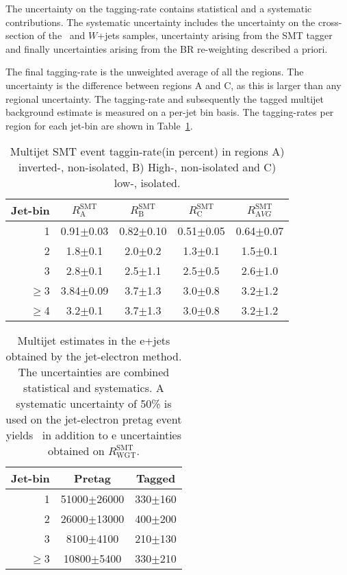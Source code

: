 The uncertainty on the tagging-rate contains statistical and a systematic contributions. The systematic uncertainty includes the uncertainty on the cross-section of the \ttbar\ and $W$+jets samples, uncertainty arising from the SMT tagger and finally uncertainties arising from the BR re-weighting described a priori.

The final tagging-rate is the unweighted average of all the regions. The uncertainty is the difference between regions A and C, as this is larger than any regional uncertainty. The tagging-rate and subsequently the tagged multijet background estimate is measured on a per-jet bin basis. The tagging-rates per region for each jet-bin are shown in Table~\ref{tab:rsmt}.

\begin{table}[htbp]
  \centering
    \begin{tabular}{r|cccc}
      \hline
      Jet-bin & $R^{\textrm{SMT}}_{\textrm{A}}$ & $R^{\textrm{SMT}}_{\textrm{B}}$ & $R^{\textrm{SMT}}_{\textrm{C}}$ & $R^{\textrm{SMT}}_{\textrm{A}VG}$ \\ \hline \hline
      1      & 0.91$\pm$0.03 & 0.82$\pm$0.10 & 0.51$\pm$0.05 & 0.64$\pm$0.07 \\
      2      & 1.8$\pm$0.1   & 2.0$\pm$0.2   & 1.3$\pm$0.1   & 1.5$\pm$0.1 \\
      3      & 2.8$\pm$0.1   & 2.5$\pm$1.1   & 2.5$\pm$0.5   & 2.6$\pm$1.0 \\
      $\ge$3 & 3.84$\pm$0.09 & 3.7$\pm$1.3   & 3.0$\pm$0.8   & 3.2$\pm$1.2 \\
      $\ge$4 & 3.2$\pm$0.1   & 3.7$\pm$1.3   & 3.0$\pm$0.8   & 3.2$\pm$1.2 \\
      \hline
    \end{tabular}
    \caption{Multijet SMT event taggin-rate(in percent) in regions A) inverted-\met, non-isolated, B) High-\met, non-isolated and C) low-\met, isolated.} \label{tab:rsmt}
\end{table}

\begin{table}[!htbp]
    \centering
    \begin{tabular}{r|cc}
      \hline %
      Jet-bin & Pretag          & Tagged \\
      \hline %
      1       & 51000$\pm$26000 & 330$\pm$160 \\ 
      2       & 26000$\pm$13000 & 400$\pm$200 \\
      3       & 8100$\pm$4100   & 210$\pm$130 \\ 
      $\ge$3  & 10800$\pm$5400  & 330$\pm$210 \\ 
      \hline %
    \end{tabular}
    \caption{Multijet estimates in the e+jets obtained by the jet-electron method. The uncertainties are combined statistical and systematics. A systematic uncertainty of 50\% is used on the jet-electron pretag event yields~\cite{TopQuark:SingleXSectionTChannel} in addition to e uncertainties obtained on $R^{\textrm{SMT}}_{\textrm{WGT}}$.} \label{tab:rsmtest}
  \end{table}

